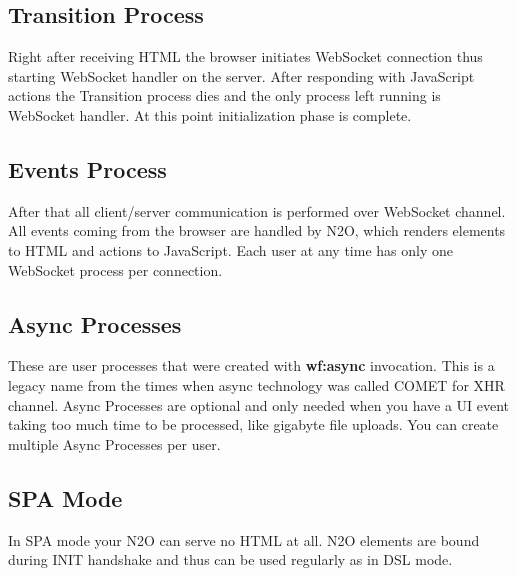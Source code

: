 \subsection{Transition Process}
Right after receiving HTML the browser initiates WebSocket connection
thus starting WebSocket handler on the server. After responding with
JavaScript actions the Transition process dies and the only process left
running is WebSocket handler. At this point initialization phase is complete.

\subsection{Events Process}
After that all client/server communication is performed over
WebSocket channel. All events coming from the browser are
handled by N2O, which renders elements to HTML and actions to
JavaScript. Each user at any time has only one WebSocket process
per connection.

\subsection{Async Processes}
These are user processes that were created with {\bf wf:async} invocation.
This is a legacy name from the times when async technology
was called COMET for XHR channel. Async Processes are optional
and only needed when you have a UI event taking too much
time to be processed, like gigabyte file uploads. You can create
multiple Async Processes per user.

\subsection{SPA Mode}
In SPA mode your N2O can serve no HTML at all. N2O elements are
bound during INIT handshake and thus can be used regularly as in DSL mode.


